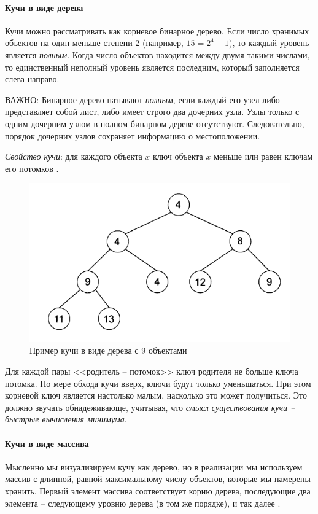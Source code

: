 \documentclass[%
	11pt,
	a4paper,
	utf8,
		]{article}
\begin{document}
\paragraph{Кучи в виде дерева} Кучи можно рассматривать как корневое бинарное дерево. Если число хранимых объектов на один меньше степени 2 (например, $ 15 = 2^4 - 1 $), то каждый уровень является \emph{полным}. Когда число объектов находится между двумя такими числами, то единственный неполный уровень является последним, который заполняется слева направо.

ВАЖНО: Бинарное дерево называют \emph{полным}, если каждый его узел либо представляет собой лист, либо имеет строго два дочерних узла. Узлы только с одним дочерним узлом в полном бинарном дереве отсутствуют. Следовательно, порядок дочерних узлов сохраняет информацию о местоположении.

\emph{Свойство кучи}: для каждого объекта $ x $ ключ объекта $ x $ меньше или равен ключам его потомков .

\begin{figure}[h]
	\centering
	\includegraphics[scale=0.65]{figures/heap_tree.png}
	\caption{ Пример кучи в виде дерева с 9 объектами }\label{fig:heap_tree}
\end{figure}

Для каждой пары <<родитель -- потомок>> ключ родителя не больше ключа потомка. По мере обхода кучи вверх, ключи будут только уменьшаться. При этом корневой ключ является настолько малым, насколько это может получиться. Это должно звучать обнадеживающе, учитывая, что \emph{\color{blue}смысл существования кучи -- быстрые вычисления минимума}.

\paragraph{Кучи в виде массива} Мысленно мы визуализируем кучу как дерево, но в реализации мы используем массив с длинной, равной максимальному числу объектов, которые мы намерены хранить. Первый элемент массива соответствует корню дерева, последующие два элемента -- следующему уровню дерева (в том же порядке), и так далее .
\end{document}
